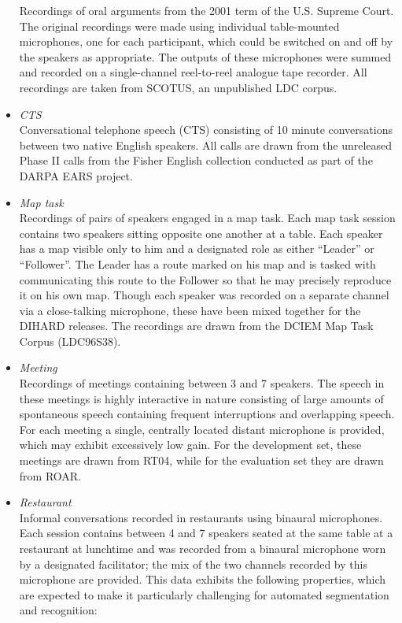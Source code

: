 \documentclass{article}
\begin{document}
\begin{appendices}
\begin{itemize}
            Recordings of oral arguments from the 2001 term of the U.S. Supreme Court. The original recordings were made using individual table-mounted microphones, one for each participant, which could be switched on and off by the speakers as appropriate. The outputs of these microphones were summed and recorded on a single-channel reel-to-reel analogue tape recorder. All recordings are taken from SCOTUS, an unpublished LDC corpus.
        \item {\it CTS} \\
            Conversational telephone speech (CTS) consisting of 10 minute conversations between two native English speakers. All calls are drawn from the unreleased Phase II calls from the Fisher English collection conducted as part of the DARPA EARS project.
        \item {\it Map task} \\
            Recordings of pairs of speakers engaged in  a map task. Each map task session contains two speakers sitting opposite one another at a table. Each speaker has a map visible only to him and a designated role as either ``Leader'' or ``Follower''. The Leader has a route marked on his map and is tasked with communicating this route to the Follower so that he may precisely reproduce it on his own map. Though each speaker was recorded on a separate channel via a close-talking microphone, these have been mixed together for the DIHARD releases. The recordings are drawn from the DCIEM Map Task Corpus (LDC96S38).
        \item {\it Meeting} \\
            Recordings of meetings containing between 3 and 7 speakers. The speech in these meetings is highly interactive in nature consisting of large amounts of spontaneous speech containing frequent interruptions and overlapping speech. For each meeting a single, centrally located distant microphone is provided, which may exhibit excessively low gain. For the development set, these meetings are drawn from RT04, while for the evaluation set they are drawn from ROAR.
        \item {\it Restaurant} \\
            Informal conversations recorded in restaurants using binaural microphones. Each session contains between 4 and 7 speakers seated at the same table at a restaurant at lunchtime and was recorded from a binaural microphone worn by a designated facilitator; the mix of the two channels recorded by this microphone are provided. This data exhibits the following properties, which are expected to make it particularly challenging for automated segmentation and recognition:

\end{itemize}
\end{appendices}
\end{document}
